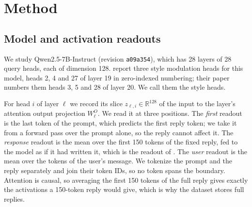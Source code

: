 %
\section{Method}
\label{sec:method}

\subsection{Model and activation readouts}
\label{sec:readouts}
We study Qwen2.5-7B-Instruct \citep{qwen2025technical} (revision \texttt{a09a354}), which has 28 layers of 28 query heads, each of dimension 128. \citet{izawa2026steering} report three style modulation heads for this model, heads 2, 4 and 27 of layer 19 in zero-indexed numbering; their paper numbers them heads 3, 5 and 28 of layer 20. We call them the style heads.

For head $i$ of layer $\ell$ we record its slice $z_{\ell,i} \in \mathbb{R}^{128}$ of the input to the layer's attention output projection $W^O_\ell$. We read it at three positions. The \emph{first} readout is the last token of the prompt, which predicts the first reply token; we take it from a forward pass over the prompt alone, so the reply cannot affect it. The \emph{response} readout is the mean over the first 150 tokens of the fixed reply, fed to the model as if it had written it, which is the readout of \citet{izawa2026steering}. The \emph{user} readout is the mean over the tokens of the user's message. We tokenize the prompt and the reply separately and join their token IDs, so no token spans the boundary. Attention is causal, so averaging the first 150 tokens of the full reply gives exactly the activations a 150-token reply would give, which is why the dataset stores full replies.

